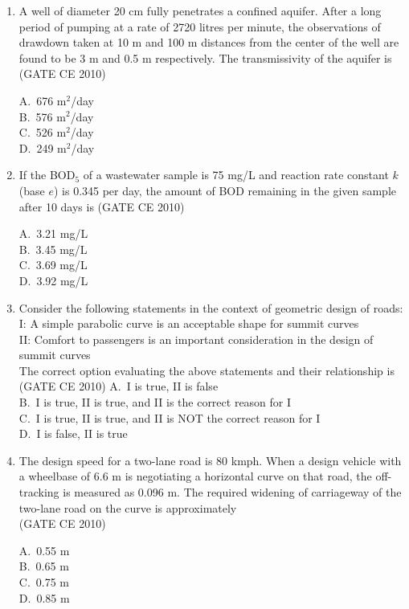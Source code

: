 \documentclass[journal,12pt,onecolumn]{exam}
\theoremstyle{remark}
\begin{document}
\begin{enumerate}
\noindent\item A well of diameter 20 cm fully penetrates a confined aquifer. After a long period of pumping at a rate of 2720 litres per minute, the observations of drawdown taken at 10 m and 100 m distances from the center of the well are found to be 3 m and 0.5 m respectively. The transmissivity of the aquifer is
\hfill{(GATE CE 2010)}
\begin{multicols}{4}
A.\ 676 m$^2$/day \\
B.\ 576 m$^2$/day \\
C.\ 526 m$^2$/day \\
D.\ 249 m$^2$/day
\end{multicols}

\noindent\item If the BOD$_5$ of a wastewater sample is 75 mg/L and reaction rate constant $k$ (base $e$) is 0.345 per day, the amount of BOD remaining in the given sample after 10 days is
\hfill{(GATE CE 2010)}
\begin{multicols}{4}
A.\ 3.21 mg/L \\
B.\ 3.45 mg/L \\
C.\ 3.69 mg/L \\
D.\ 3.92 mg/L
\end{multicols}

\noindent\item Consider the following statements in the context of geometric design of roads: \\[0.1cm]
I: A simple parabolic curve is an acceptable shape for summit curves \\ 
II: Comfort to passengers is an important consideration in the design of summit curves \\[0.2cm]
The correct option evaluating the above statements and their relationship is
\hfill{(GATE CE 2010)}\newline
A.\ I is true, II is false \\
B.\ I is true, II is true, and II is the correct reason for I \\
C.\ I is true, II is true, and II is NOT the correct reason for I \\
D.\ I is false, II is true

\noindent\item The design speed for a two-lane road is 80 kmph. When a design vehicle with a wheelbase of 6.6 m is negotiating a horizontal curve on that road, the off-tracking is measured as 0.096 m. The required widening of carriageway of the two-lane road on the curve is approximately
\\ \hfill{(GATE CE 2010)}
\begin{multicols}{4}
A.\ 0.55 m \\
B.\ 0.65 m \\
C.\ 0.75 m \\
D.\ 0.85 m
\end{multicols}


\end{enumerate}
\end{document}
